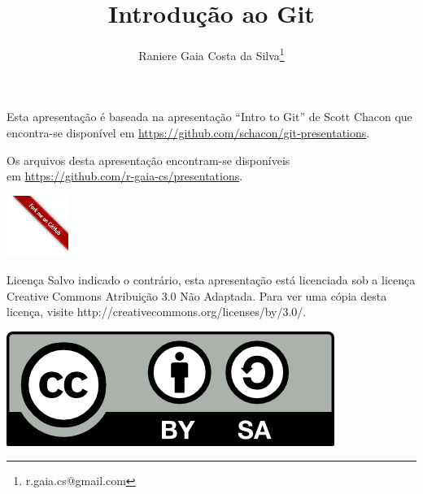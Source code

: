 \documentclass[11pt]{beamer}
\begin{document}
\title{Introdução ao Git}
\author[Raniere Silva]{Raniere Gaia Costa da
Silva\footnote{r.gaia.cs@gmail.com}}

\begin{frame}
    \maketitle
\end{frame}

\begin{frame}
    Esta apresentação é baseada na apresentação ``Intro to Git'' de Scott
    Chacon que encontra-se disponível em
    \url{https://github.com/schacon/git-presentations}.

    \begin{block}{}
        Os arquivos desta apresentação encontram-se disponíveis \\
        em \url{https://github.com/r-gaia-cs/presentations}. \\
        \vspace{-33pt}
        \begin{flushright}
            \includegraphics[height=2cm]{../figures/forkme_right_red.png}
        \end{flushright}
    \end{block}

    \begin{block}{Licença}
        Salvo indicado o contrário, esta apresentação está licenciada sob a licença
        Creative Commons Atribuição 3.0 Não Adaptada. Para ver uma cópia desta
        licença, visite http://creativecommons.org/licenses/by/3.0/.
        \begin{center}
            \includegraphics{../figures/cc-by-sa.png}
        \end{center}
    \end{block}
\end{frame}
\end{document}
